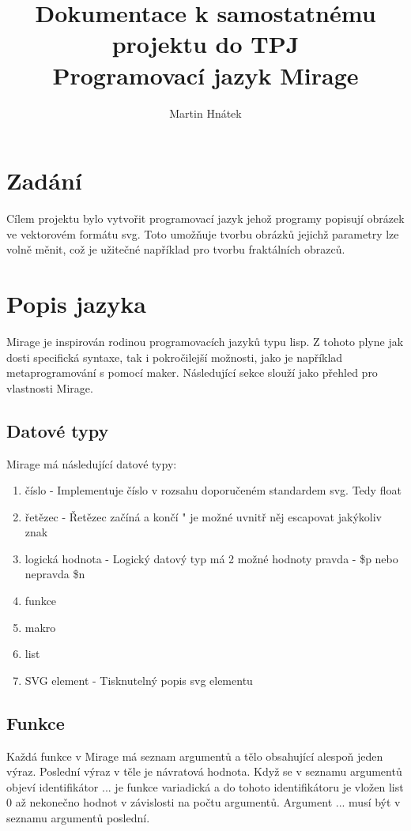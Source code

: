 \documentclass[a4paper,11pt]{article}
\author{Martin Hnátek}
\title{Dokumentace k samostatnému projektu do TPJ\\Programovací jazyk Mirage}
\date{}
\begin{document}
\maketitle

\newpage
\tableofcontents

\newpage

\section{Zadání}
Cílem projektu bylo vytvořit programovací jazyk jehož programy popisují obrázek ve vektorovém formátu svg. Toto umožňuje tvorbu obrázků jejichž parametry lze volně měnit, což je užitečné například pro tvorbu fraktálních obrazců.

\section{Popis jazyka}
Mirage je inspirován rodinou programovacích jazyků typu lisp. Z tohoto plyne jak dosti specifická syntaxe, tak i pokročilejší možnosti, jako je například metaprogramování s pomocí maker. Následující sekce slouží jako přehled pro vlastnosti Mirage.

\subsection{Datové typy}
Mirage má následující datové typy:
\begin{enumerate}
	\item číslo - Implementuje číslo v rozsahu doporučeném standardem svg. Tedy float
	\item řetězec - Řetězec začíná a končí " je možné uvnitř něj escapovat jakýkoliv znak
	\item logická hodnota - Logický datový typ má 2 možné hodnoty pravda - \$p nebo nepravda \$n
	\item funkce
	\item makro
	\item list
	\item SVG element - Tisknutelný popis svg elementu
\end{enumerate}

\subsection{Funkce}
Každá funkce v Mirage má seznam argumentů a tělo obsahující alespoň jeden výraz. Poslední výraz v těle je návratová hodnota. Když se v seznamu argumentů objeví identifikátor ... je funkce variadická a do tohoto identifikátoru je vložen list 0 až nekonečno hodnot v závislosti na počtu argumentů. Argument ... musí být v seznamu argumentů poslední.
\end{document}
